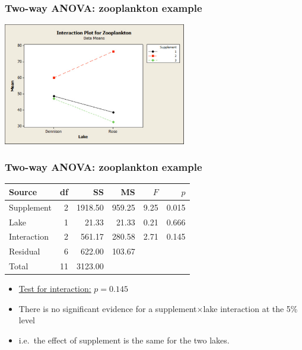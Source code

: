 \documentclass[12pt,xcolor=dvipsnames,handout,mathserif,aspectratio=169]{beamer}
\begin{document}
\begin{frame}
\frametitle{Two-way ANOVA: zooplankton example}
\begin{center}
\includegraphics[width=8cm]{InteractionPlotforZooplankton.pdf}
\end{center}
\end{frame}

\begin{frame}
\frametitle{Two-way ANOVA: zooplankton example}
\vspace*{0.5cm}
\begin{center}
{\small{
\begin{tabular}{lrrrrr} \hline
Source& df& SS& MS& $F$& $p$\\ \hline
Supplement    &2  &1918.50  &959.25  &9.25  &0.015\\
Lake          &1    &21.33   &21.33  &0.21 & 0.666\\
Interaction   &2   &561.17  &280.58 & 2.71&  0.145\\
Residual         &6   &622.00  &103.67 & & \\\hline
Total        &11  &3123.00 & & &\\\hline
\end{tabular}}}
\end{center}
\vspace*{0.5cm}
\begin{itemize}
\item \underline{Test for interaction:} $p = 0.145$
\vspace*{0.3cm}
\item There is no significant evidence for a supplement$\times$lake interaction at the 5\% level
\vspace*{0.3cm}
\item i.e.~the effect of supplement is the same for the two lakes.
\end{itemize}
\end{frame}
\end{document}
